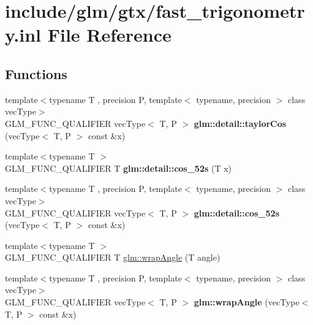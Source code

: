 \hypertarget{fast__trigonometry_8inl}{}\section{include/glm/gtx/fast\+\_\+trigonometry.inl File Reference}
\label{fast__trigonometry_8inl}
\subsection*{Functions}
\begin{DoxyCompactItemize}
\item 
\mbox{\label{fast__trigonometry_8inl_a4a16281a64def18b20ab307b516095c2}} 
{\footnotesize template$<$typename T , precision P, template$<$ typename, precision $>$ class vec\+Type$>$ }\\G\+L\+M\+\_\+\+F\+U\+N\+C\+\_\+\+Q\+U\+A\+L\+I\+F\+I\+ER vec\+Type$<$ T, P $>$ {\bfseries glm\+::detail\+::taylor\+Cos} (vec\+Type$<$ T, P $>$ const \&x)
\item 
\mbox{\label{fast__trigonometry_8inl_a09055f8d723109dc95c8cc2309e20acc}} 
{\footnotesize template$<$typename T $>$ }\\G\+L\+M\+\_\+\+F\+U\+N\+C\+\_\+\+Q\+U\+A\+L\+I\+F\+I\+ER T {\bfseries glm\+::detail\+::cos\+\_\+52s} (T x)
\item 
\mbox{\label{fast__trigonometry_8inl_ad0c49f46dc1033d16811b2b90f1dcc64}} 
{\footnotesize template$<$typename T , precision P, template$<$ typename, precision $>$ class vec\+Type$>$ }\\G\+L\+M\+\_\+\+F\+U\+N\+C\+\_\+\+Q\+U\+A\+L\+I\+F\+I\+ER vec\+Type$<$ T, P $>$ {\bfseries glm\+::detail\+::cos\+\_\+52s} (vec\+Type$<$ T, P $>$ const \&x)
\item 
{\footnotesize template$<$typename T $>$ }\\G\+L\+M\+\_\+\+F\+U\+N\+C\+\_\+\+Q\+U\+A\+L\+I\+F\+I\+ER T \hyperlink{group__gtx__fast__trigonometry_ga069527c6dbd64f53435b8ebc4878b473}{glm\+::wrap\+Angle} (T angle)
\item 
\mbox{\label{fast__trigonometry_8inl_a643ff6d35f2ea3652029cf4197ca900e}} 
{\footnotesize template$<$typename T , precision P, template$<$ typename, precision $>$ class vec\+Type$>$ }\\G\+L\+M\+\_\+\+F\+U\+N\+C\+\_\+\+Q\+U\+A\+L\+I\+F\+I\+ER vec\+Type$<$ T, P $>$ {\bfseries glm\+::wrap\+Angle} (vec\+Type$<$ T, P $>$ const \&x)

\end{DoxyCompactItemize}
